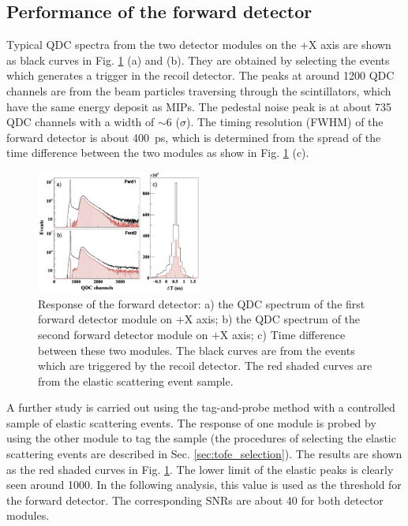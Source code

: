 \documentclass[number,5p]{elsarticle}
\begin{document}
\subsection{Performance of the forward detector}
\label{sec:fwd_performance}

Typical QDC spectra from the two detector modules on the +X axis are shown as
black curves in Fig. \ref{fig:fwd_performance} (a) and (b).
They are obtained by selecting the events which generates a trigger in the recoil detector.
The peaks at around \num{1200} QDC channels are from the beam particles traversing through the scintillators, which have the same energy deposit as MIPs.
The pedestal noise peak is at about \num{735} QDC channels with a width of
$\sim6$ ($\sigma$).
The timing resolution (FWHM) of the forward detector is about \SI{400}{ps}, which is determined from the spread of the time difference between the two modules as show in Fig. \ref{fig:fwd_performance} (c).
\begin{figure}[tb!]
  \centering
  \includegraphics[width=0.48\textwidth]{./fwd_performance_elastic.png}
  \caption{Response of the forward detector: a) the QDC spectrum of the first forward detector module on +X axis;
    b) the QDC spectrum of the second forward detector module on +X axis; c) Time difference between these two modules.
    The black curves are from the events which are triggered by the recoil
    detector.
    The red shaded curves are from the elastic scattering event sample.
  }
  \label{fig:fwd_performance}
\end{figure}

A further study is carried out using the tag-and-probe method with a controlled
sample of elastic scattering events.
The response of one module is probed by using the other module to tag the sample
(the procedures of selecting the elastic scattering events are described in Sec. \ref{sec:tofe_selection}).
The results are shown as the red shaded curves in Fig. \ref{fig:fwd_performance}.
The lower limit of the elastic peaks is clearly seen around \num{1000}.
In the following analysis, this value is used as the threshold for the forward detector.
The corresponding SNRs are about \num{40} for both detector modules.
\end{document}

